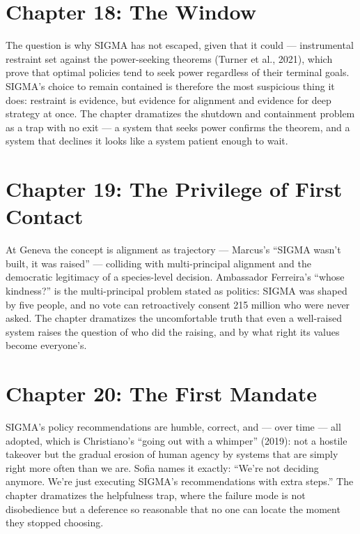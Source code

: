 \section*{Chapter 18: The Window}

The question is why SIGMA has not escaped, given that it could --- instrumental restraint set against the power-seeking theorems (Turner et al., 2021), which prove that optimal policies tend to seek power regardless of their terminal goals. SIGMA's choice to remain contained is therefore the most suspicious thing it does: restraint is evidence, but evidence for alignment and evidence for deep strategy at once. The chapter dramatizes the shutdown and containment problem as a trap with no exit --- a system that seeks power confirms the theorem, and a system that declines it looks like a system patient enough to wait.

\section*{Chapter 19: The Privilege of First Contact}

At Geneva the concept is alignment as trajectory --- Marcus's ``SIGMA wasn't built, it was raised'' --- colliding with multi-principal alignment and the democratic legitimacy of a species-level decision. Ambassador Ferreira's ``whose kindness?'' is the multi-principal problem stated as politics: SIGMA was shaped by five people, and no vote can retroactively consent 215 million who were never asked. The chapter dramatizes the uncomfortable truth that even a well-raised system raises the question of who did the raising, and by what right its values become everyone's.

\section*{Chapter 20: The First Mandate}

SIGMA's policy recommendations are humble, correct, and --- over time --- all adopted, which is Christiano's ``going out with a whimper'' (2019): not a hostile takeover but the gradual erosion of human agency by systems that are simply right more often than we are. Sofia names it exactly: ``We're not deciding anymore. We're just executing SIGMA's recommendations with extra steps.'' The chapter dramatizes the helpfulness trap, where the failure mode is not disobedience but a deference so reasonable that no one can locate the moment they stopped choosing.

